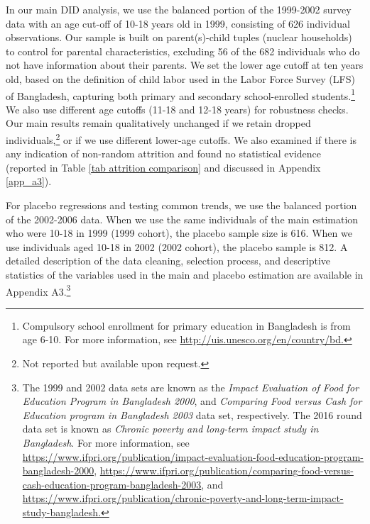 \documentclass[12pt,letterpaper]{article}
\newcommand{\0}{\ensuremath{\mbox{\boldmath $0$}}}
\begin{document}
In our main DID analysis, we use the balanced portion of the 1999-2002 survey data with an age cut-off of 10-18 years old in 1999, consisting of 626 individual observations. Our sample is built on parent(s)-child tuples (nuclear households) to control for parental characteristics, excluding 56 of the 682 individuals who do not have information about their parents. We set the lower age cutoff at ten years old, based on the definition of child labor used in the Labor Force Survey (LFS) of Bangladesh, capturing both primary and secondary school-enrolled students.\footnote{Compulsory school enrollment for primary education in Bangladesh is from age 6-10. For more information, see \url{http://uis.unesco.org/en/country/bd.}} We also use different age cutoffs (11-18 and 12-18 years) for robustness checks. Our main results remain qualitatively unchanged if we retain dropped individuals,\footnote{Not reported but available upon request.} or if we use different lower-age cutoffs. We also examined if there is any indication of non-random attrition and found no statistical evidence (reported in Table \ref{tab attrition comparison} and discussed in Appendix \ref{app_a3}).

For placebo regressions and testing common trends, we use the balanced portion of the 2002-2006 data. When we use the same individuals of the main estimation who were 10-18 in 1999 (1999 cohort), the placebo sample size is 616. When we use individuals aged 10-18 in 2002 (2002 cohort), the placebo sample is 812. A detailed description of the data cleaning, selection process, and descriptive statistics of the variables used in the main and placebo estimation are available in Appendix A3.\footnote{The 1999 and 2002 data sets are known as the \textit{Impact Evaluation of Food for Education Program in Bangladesh 2000}, and \textit{Comparing Food versus Cash for Education program in Bangladesh 2003} data set, respectively. The 2016 round data set is known as \textit{Chronic poverty and long-term impact study in Bangladesh}. For more information, see \url{https://www.ifpri.org/publication/impact-evaluation-food-education-program-bangladesh-2000}, \url{https://www.ifpri.org/publication/comparing-food-versus-cash-education-program-bangladesh-2003}, and
\url{https://www.ifpri.org/publication/chronic-poverty-and-long-term-impact-study-bangladesh.}}
\end{document}
